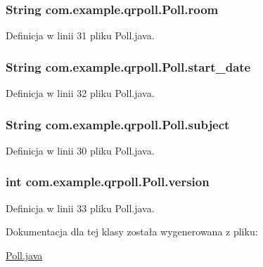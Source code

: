 \hypertarget{classcom_1_1example_1_1qrpoll_1_1_poll_a73035d1fde89a6b4d69cd4e5ee610b8b}{
\subsubsection[{room}]{\setlength{\rightskip}{0pt plus 5cm}String com.\+example.\+qrpoll.\+Poll.\+room\hspace{0.3cm}{\ttfamily [private]}}}\label{classcom_1_1example_1_1qrpoll_1_1_poll_a73035d1fde89a6b4d69cd4e5ee610b8b}


Definicja w linii 31 pliku Poll.\+java.

\hypertarget{classcom_1_1example_1_1qrpoll_1_1_poll_a43059ae0d84924af4a6f876f31ee26d4}{
\subsubsection[{start\+\_\+date}]{\setlength{\rightskip}{0pt plus 5cm}String com.\+example.\+qrpoll.\+Poll.\+start\+\_\+date\hspace{0.3cm}{\ttfamily [private]}}}\label{classcom_1_1example_1_1qrpoll_1_1_poll_a43059ae0d84924af4a6f876f31ee26d4}


Definicja w linii 32 pliku Poll.\+java.

\hypertarget{classcom_1_1example_1_1qrpoll_1_1_poll_ac710a3059ee7152dd6aa5e7bea399726}{
\subsubsection[{subject}]{\setlength{\rightskip}{0pt plus 5cm}String com.\+example.\+qrpoll.\+Poll.\+subject\hspace{0.3cm}{\ttfamily [private]}}}\label{classcom_1_1example_1_1qrpoll_1_1_poll_ac710a3059ee7152dd6aa5e7bea399726}


Definicja w linii 30 pliku Poll.\+java.

\hypertarget{classcom_1_1example_1_1qrpoll_1_1_poll_af8617455744b1f5935c9c4042345782c}{
\subsubsection[{version}]{\setlength{\rightskip}{0pt plus 5cm}int com.\+example.\+qrpoll.\+Poll.\+version\hspace{0.3cm}{\ttfamily [private]}}}\label{classcom_1_1example_1_1qrpoll_1_1_poll_af8617455744b1f5935c9c4042345782c}


Definicja w linii 33 pliku Poll.\+java.



Dokumentacja dla tej klasy została wygenerowana z pliku\+:\begin{DoxyCompactItemize}
\item 
\hyperlink{_poll_8java}{Poll.\+java}\end{DoxyCompactItemize}
